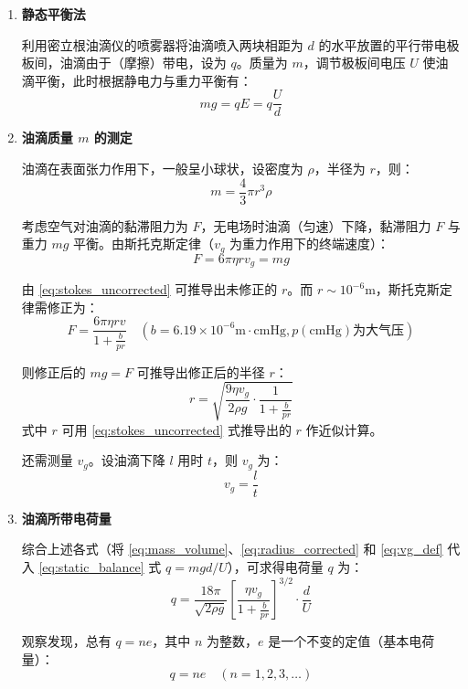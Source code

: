 \documentclass[yuxi]{../../templates/Report}%
\begin{document}
\begin{enumerate}
    \item \textbf{静态平衡法}

    利用密立根油滴仪的喷雾器将油滴喷入两块相距为 $d$ 的水平放置的平行带电极板间，油滴由于（摩擦）带电，设为 $q$。质量为 $m$，调节极板间电压 $U$ 使油滴平衡，此时根据静电力与重力平衡有：
    \begin{equation}
        mg = qE = q\frac{U}{d} \label{eq:static_balance}
    \end{equation}

    \item \textbf{油滴质量 $m$ 的测定}

    油滴在表面张力作用下，一般呈小球状，设密度为 $\rho$，半径为 $r$，则：
    \begin{equation}
        m = \frac{4}{3}\pi r^3 \rho \label{eq:mass_volume}
    \end{equation}

    考虑空气对油滴的黏滞阻力为 $F$，无电场时油滴（匀速）下降，黏滞阻力 $F$ 与重力 $mg$ 平衡。由斯托克斯定律（$v_g$ 为重力作用下的终端速度）：
    \begin{equation}
        F = 6\pi\eta rv_g = mg \label{eq:stokes_uncorrected}
    \end{equation}

    由 \cref{eq:stokes_uncorrected} 可推导出未修正的 $r$。而 $r \sim 10^{-6} \text{m}$，斯托克斯定律需修正为：
    \begin{equation}
        F = \frac{6\pi\eta rv}{1 + \frac{b}{pr}} \quad (b=6.19 \times 10^{-6} \text{m} \cdot \text{cmHg}, p(\text{cmHg}) \text{为大气压}) \label{eq:stokes_corrected_F}
    \end{equation}

    则修正后的 $mg = F$ 可推导出修正后的半径 $r$：
    \begin{equation}
        r = \sqrt{\frac{9\eta v_g}{2\rho g} \cdot \frac{1}{1 + \frac{b}{pr}}} \label{eq:radius_corrected}
    \end{equation}
    式中 $r$ 可用 \cref{eq:stokes_uncorrected} 式推导出的 $r$ 作近似计算。

    还需测量 $v_g$。设油滴下降 $l$ 用时 $t$，则 $v_g$ 为：
    \begin{equation}
        v_g = \frac{l}{t} \label{eq:vg_def}
    \end{equation}

    \item \textbf{油滴所带电荷量}

    综合上述各式（将 \cref{eq:mass_volume}、\cref{eq:radius_corrected} 和 \cref{eq:vg_def} 代入 \cref{eq:static_balance} 式 $q = mgd/U$），可求得电荷量 $q$ 为：
    \begin{equation}
        q = \frac{18\pi}{\sqrt{2\rho g}} \left[ \frac{\eta v_g}{1+\frac{b}{pr}} \right]^{3/2} \cdot \frac{d}{U} \label{eq:charge_final}
    \end{equation}

    观察发现，总有 $q = ne$，其中 $n$ 为整数，$e$ 是一个不变的定值（基本电荷量）：
    \begin{equation}
        q = ne \quad (n=1, 2, 3, \dots) \label{eq:charge_quantization}
    \end{equation}

\end{enumerate}
\end{document}
